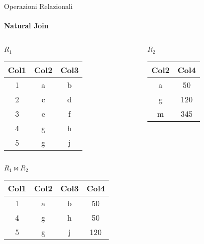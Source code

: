     \begin{frame}{Operazioni Relazionali}
        \framesubtitle{Natural Join}
        \begin{columns}
            \begin{column}{0.48\textwidth}
                \centering
                {\small $R_1$}
                \newline
        \begin{tabular}{|c|c|c|}
            \hline
            \rowcolor{cyan!30}Col1 & Col2 & Col3 \\
            \hline
            1 & \cellcolor{green!30}a & b \\ \hline
            2 & c & d \\ \hline
            3 & e & f \\ \hline
            4 & \cellcolor{red!30}g & h \\ \hline
            5 & \cellcolor{red!30}g & j \\ \hline
            \end{tabular}
            \end{column}
            \begin{column}{0.48\textwidth}
                \centering
                {\small $R_2$}
                \newline
                \begin{tabular}{|c|c|}
                    \hline
                    \rowcolor{cyan!30} Col2 & Col4 \\ \hline
                    \cellcolor{green!30}a & 50 \\ \hline
                    \cellcolor{red!30}g & 120 \\ \hline
                    m & 345 \\ \hline
                    \end{tabular}
            \end{column}
        \end{columns}
        \vspace{.5cm}
        \centering
        $R_1 \bowtie R_2$
        \begin{tabular}{|c|c|c|c|}
            \hline
            \rowcolor{cyan!30} Col1 & Col2 & Col3 & Col4 \\ \hline
            1 & a & b & 50 \\ \hline
            4 & g & h & 50 \\ \hline
            5 & g & j & 120 \\ \hline
            \end{tabular}
    \end{frame}
